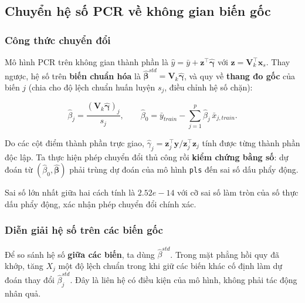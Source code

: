 \subsection{Chuyển hệ số PCR về không gian biến
gốc}\label{chuyux1ec3n-hux1ec7-sux1ed1-pcr-vux1ec1-khuxf4ng-gian-biux1ebfn-gux1ed1c}

\subsubsection{Công thức chuyển
đổi}\label{cuxf4ng-thux1ee9c-chuyux1ec3n-ux111ux1ed5i}

Mô hình PCR trên không gian thành phần là
\(\hat y = \bar y + \mathbf{z}^\top\hat{\boldsymbol\gamma}\) với
\(\mathbf{z} = \mathbf{V}_k^\top \mathbf{x}_s\). Thay ngược, hệ số trên
\textbf{biến chuẩn hóa} là
\(\hat{\boldsymbol\beta}^{std} = \mathbf{V}_k\hat{\boldsymbol\gamma}\),
và quy về \textbf{thang đo gốc} của biến \(j\) (chia cho độ lệch chuẩn
huấn luyện \(s_j\), điều chỉnh hệ số chặn):

\[
\hat\beta_j = \frac{(\mathbf{V}_k\hat{\boldsymbol\gamma})_j}{s_j},
\qquad
\hat\beta_0 = \bar y_{train} - \sum_{j=1}^{p} \hat\beta_j\,\bar x_{j,train}.
\]

Do các cột điểm thành phần trực giao,
\(\hat\gamma_j = \mathbf{z}_j^\top\mathbf{y} / \mathbf{z}_j^\top\mathbf{z}_j\)
tính được từng thành phần độc lập. Ta thực hiện phép chuyển đổi thủ công
rồi \textbf{kiểm chứng bằng số}: dự đoán từ
\((\hat\beta_0, \hat{\boldsymbol\beta})\) phải trùng dự đoán của mô hình
\texttt{pls} đến sai số dấu phẩy động.

Sai số lớn nhất giữa hai cách tính là \(2.52e-14\) với cỡ sai số làm
tròn của số thực dấu phẩy động, xác nhận phép chuyển đổi chính xác.

\subsubsection{Diễn giải hệ số trên các biến
gốc}\label{diux1ec5n-giux1ea3i-hux1ec7-sux1ed1-truxean-cuxe1c-biux1ebfn-gux1ed1c}

Để so sánh hệ số \textbf{giữa các biến}, ta dùng \(\hat\beta^{std}\).
Trong mặt phẳng hồi quy đã khớp, tăng \(X_j\) một độ lệch chuẩn trong
khi giữ các biến khác cố định làm dự đoán thay đổi
\(\hat\beta^{std}_j\). Đây là liên hệ có điều kiện của mô hình, không
phải tác động nhân quả.

